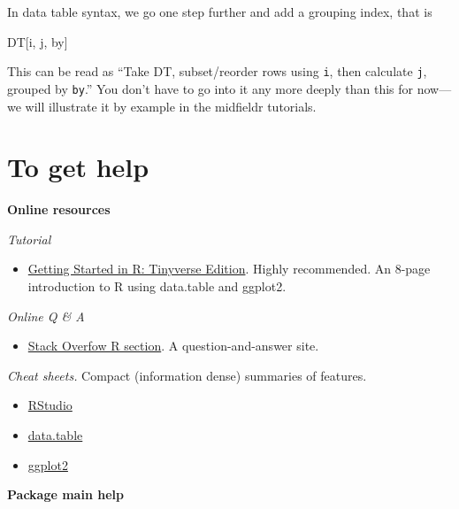 \documentclass[
]{book}
\newenvironment{Shaded}{\begin{snugshade}}{\end{snugshade}}
\newcommand{\NormalTok}[1]{#1}
\providecommand{\tightlist}{%
  \setlength{\itemsep}{0pt}\setlength{\parskip}{0pt}}
\begin{document}
In data table syntax, we go one step further and add a grouping index, that is

\begin{Shaded}
\begin{Highlighting}[]
\NormalTok{DT[i, j, by]}
\end{Highlighting}
\end{Shaded}

This can be read as ``Take DT, subset/reorder rows using \texttt{i}, then calculate \texttt{j}, grouped by \texttt{by}.'' You don't have to go into it any more deeply than this for now---we will illustrate it by example in the midfieldr tutorials.

\hypertarget{to-get-help}{%
\section{To get help}\label{to-get-help}}

\textbf{Online resources}

\emph{Tutorial}

\begin{itemize}
\tightlist
\item
  \href{https://eddelbuettel.github.io/gsir-te/Getting-Started-in-R.pdf}{Getting Started in R: Tinyverse Edition}. Highly recommended. An 8-page introduction to R using data.table and ggplot2.
\end{itemize}

\emph{Online Q \& A}

\begin{itemize}
\tightlist
\item
  \href{https://stackoverflow.com/questions/tagged/r}{Stack Overfow R section}. A question-and-answer site.
\end{itemize}

\emph{Cheat sheets.} Compact (information dense) summaries of features.

\begin{itemize}
\tightlist
\item
  \href{https://github.com/rstudio/cheatsheets/raw/master/rstudio-ide.pdf}{RStudio}
\item
  \href{https://raw.githubusercontent.com/rstudio/cheatsheets/master/datatable.pdf}{data.table}
\item
  \href{https://github.com/rstudio/cheatsheets/raw/master/data-visualization-2.1.pdf}{ggplot2}
\end{itemize}

\textbf{Package main help}
\end{document}
